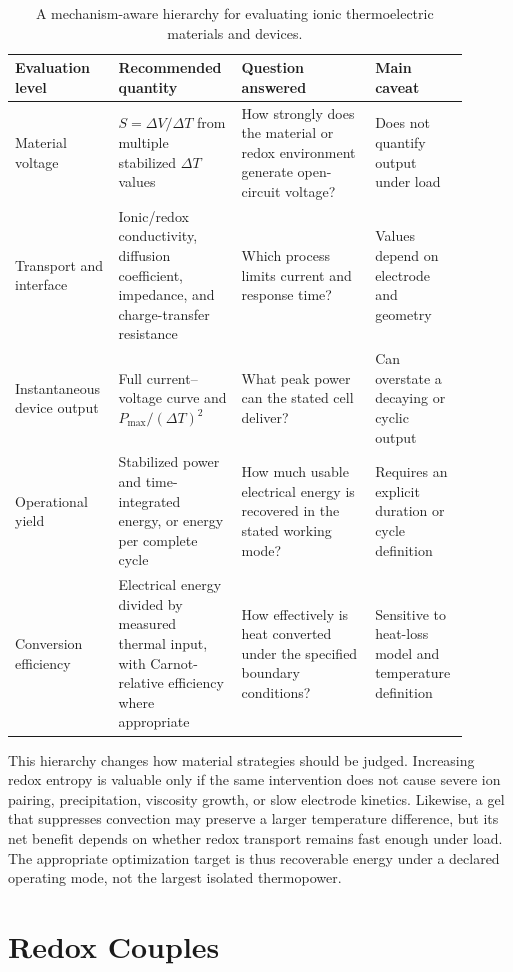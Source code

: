 \documentclass[a4paper,12pt]{report}
\begin{document}
\begin{table}[H]
\centering
\caption{A mechanism-aware hierarchy for evaluating ionic thermoelectric
materials and devices.}
\footnotesize
\begin{tabular}{>{\raggedright\arraybackslash}p{0.19\linewidth}
>{\raggedright\arraybackslash}p{0.25\linewidth}
>{\raggedright\arraybackslash}p{0.28\linewidth}
>{\raggedright\arraybackslash}p{0.18\linewidth}}
\toprule
Evaluation level & Recommended quantity & Question answered & Main caveat \\
\midrule
Material voltage & $S=\Delta V/\Delta T$ from multiple stabilized
$\Delta T$ values & How strongly does the material or redox environment
generate open-circuit voltage? & Does not quantify output under load \\
Transport and interface & Ionic/redox conductivity, diffusion coefficient,
impedance, and charge-transfer resistance & Which process limits current and
response time? & Values depend on electrode and geometry \\
Instantaneous device output & Full current--voltage curve and
$P_{\max}/(\Delta T)^2$ & What peak power can the stated cell deliver? &
Can overstate a decaying or cyclic output \\
Operational yield & Stabilized power and time-integrated energy, or energy per
complete cycle & How much usable electrical energy is recovered in the stated
working mode? & Requires an explicit duration or cycle definition \\
Conversion efficiency & Electrical energy divided by measured thermal input,
with Carnot-relative efficiency where appropriate & How effectively is heat
converted under the specified boundary conditions? & Sensitive to heat-loss
model and temperature definition \\
\bottomrule
\end{tabular}
\end{table}

This hierarchy changes how material strategies should be judged. Increasing
redox entropy is valuable only if the same intervention does not cause severe
ion pairing, precipitation, viscosity growth, or slow electrode kinetics.
Likewise, a gel that suppresses convection may preserve a larger temperature
difference, but its net benefit depends on whether redox transport remains fast
enough under load. The appropriate optimization target is thus recoverable
energy under a declared operating mode, not the largest isolated thermopower.

\section{Redox Couples}
\end{document}
